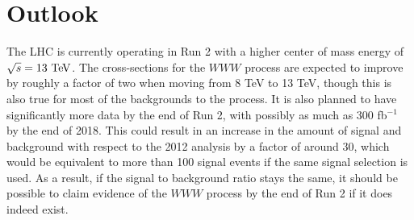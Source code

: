 \section{Outlook}
The LHC is currently operating in Run 2 with a higher center of mass energy
of $\sqrt{s} = 13 \TeV$. The cross-sections for the $WWW$ process
are expected to improve by roughly a factor of two when moving from 8 TeV
to 13 TeV, though this is also true for most of 
the backgrounds to the process.  It is also planned to have significantly
more data by the end of Run 2, with possibly as much as 300 fb$^{-1}$ by 
the end of 2018.  This could result in an increase in the amount
of signal and background with respect to the 2012 analysis
by a factor of around 30, which would be equivalent to more than 100 signal
events if the 
same signal selection is used. As a result, if the signal to background ratio
stays the same, it should 
be possible to claim evidence of the $WWW$ process by the end of Run 2 
if it does indeed exist. 


